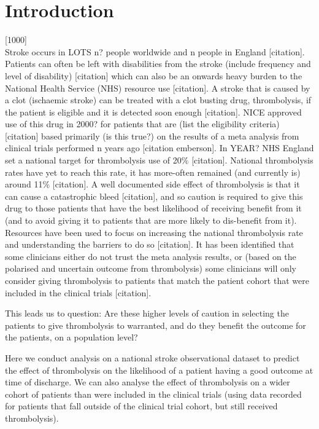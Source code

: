 \section{Introduction} [1000]\\
Stroke occurs in LOTS n? people worldwide and n people in England [citation]. Patients can often be left with disabilities from the stroke (include frequency and level of disability) [citation] which can also be an onwards heavy burden to the National Health Service (NHS) resource use [citation]. A stroke that is caused by a clot (ischaemic stroke) can be treated with a clot busting drug, thrombolysis, if the patient is eligible and it is detected soon enough [citation]. NICE approved use of this drug in 2000? for patients that are (list the eligibility criteria) [citation] based primarily (is this true?) on the results of a meta analysis from clinical trials performed n years ago [citation emberson]. In YEAR? NHS England set a national target for thrombolysis use of 20\% [citation]. National thrombolysis rates have yet to reach this rate, it has more-often remained (and currently is) around 11\% [citation]. A well documented side effect of thrombolysis is that it can cause a catastrophic bleed [citation], and so caution is required to give this drug to those patients that have the best likelihood of receiving benefit from it (and to avoid giving it to patients that are more likely to dis-benefit from it). Resources have been used to focus on increasing the national thrombolysis rate and understanding the barriers to do so [citation]. It has been identified that some clinicians either do not trust the meta analysis results, or (based on the polarised and uncertain outcome from thrombolysis) some clinicians will only consider giving thrombolysis to patients that match the patient cohort that were included in the clinical trials [citation].

This leads us to question: Are these higher levels of caution in selecting the patients to give thrombolysis to warranted, and do they benefit the outcome for the patients, on a population level?

Here we conduct analysis on a national stroke observational dataset to predict the effect of thrombolysis on the likelihood of a patient having a good outcome at time of discharge. We can also analyse the effect of thrombolysis on a wider cohort of patients than were included in the clinical trials (using data recorded for patients that fall outside of the clinical trial cohort, but still received thrombolysis).